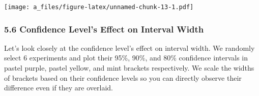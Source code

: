 \documentclass[
]{article}
\begin{document}
\texttt{[image: a\_files/figure-latex/unnamed-chunk-13-1.pdf]}

\hypertarget{confidence-levels-effect-on-interval-width}{%
\subsubsection{5.6 Confidence Level's Effect on Interval
Width}\label{confidence-levels-effect-on-interval-width}}

Let's look closely at the confidence level's effect on interval width.
We randomly select 6 experiments and plot their 95\%, 90\%, and 80\%
confidence intervals in pastel purple, pastel yellow, and mint brackets
respectively. We scale the widths of brackets based on their confidence
levels so you can directly observe their difference even if they are
overlaid.
\end{document}
